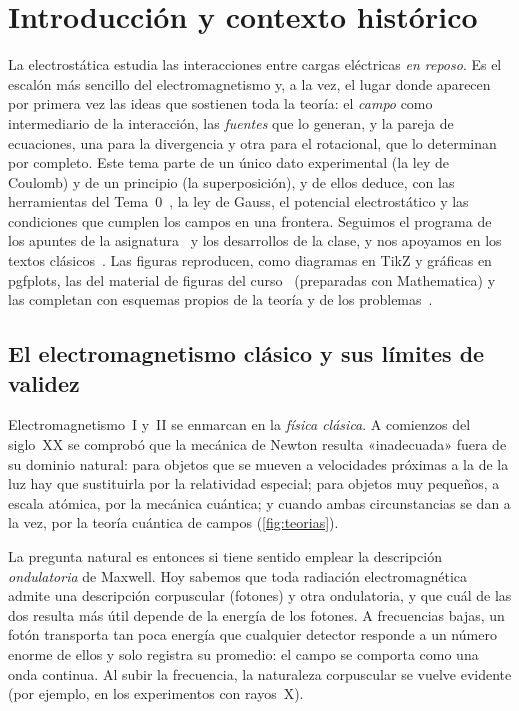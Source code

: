 \section{Introducción y contexto histórico}\label{sec:introduccion}
La electrostática estudia las interacciones entre cargas eléctricas \emph{en
reposo}. Es el escalón más sencillo del electromagnetismo y, a la vez, el lugar
donde aparecen por primera vez las ideas que sostienen toda la teoría: el
\emph{campo} como intermediario de la interacción, las \emph{fuentes} que lo
generan, y la pareja de ecuaciones, una para la divergencia y otra para el
rotacional, que lo determinan por completo. Este tema parte de un único dato
experimental (la ley de Coulomb) y de un principio (la superposición), y de ellos
deduce, con las herramientas del Tema~0~\cite{TEMA0}, la ley de Gauss, el potencial
electrostático y las condiciones que cumplen los campos en una frontera. Seguimos
el programa de los apuntes de la asignatura~\cite{APUNTES-T1} y los desarrollos de
la clase, y nos apoyamos en los textos clásicos~\cite{GRIFFITHS,WANGSNESS,JACKSON,PURCELL}. Las
figuras reproducen, como diagramas en TikZ y gráficas en pgfplots, las del material
de figuras del curso~\cite{FIGURAS-T1} (preparadas con Mathematica) y las
completan con esquemas propios de la teoría y de los problemas~\cite{PROBLEMAS-T1}.

\subsection{El electromagnetismo clásico y sus límites de validez}\label{sec:limites}
Electromagnetismo~I y~II se enmarcan en la \emph{física clásica}. A comienzos del
siglo~XX se comprobó que la mecánica de Newton resulta «inadecuada» fuera de su
dominio natural: para objetos que se mueven a velocidades próximas a la de la luz
hay que sustituirla por la relatividad especial; para objetos muy pequeños, a escala
atómica, por la mecánica cuántica; y cuando ambas circunstancias se dan a la vez, por
la teoría cuántica de campos (\cref{fig:teorias}).



La pregunta natural es entonces si tiene sentido emplear la descripción
\emph{ondulatoria} de Maxwell. Hoy sabemos que toda radiación electromagnética
admite una descripción corpuscular (fotones) y otra ondulatoria, y que cuál de las
dos resulta más útil depende de la energía de los fotones. A frecuencias bajas, un
fotón transporta tan poca energía que cualquier detector responde a un número
enorme de ellos y solo registra su promedio: el campo se comporta como una onda
continua. Al subir la frecuencia, la naturaleza corpuscular se vuelve evidente
(por ejemplo, en los experimentos con rayos~X).

